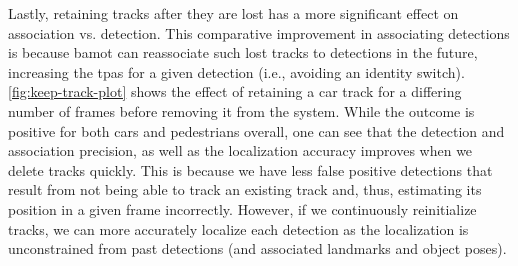 \documentclass[headsepline, hidelinks, footsepline, footinclude=false, oneside, fontsize=11pt, paper=a4, listof=totoc, bibliography=totoc]{scrbook}
\begin{document}
Lastly, retaining tracks after they are lost has a more significant effect on association vs. detection. 
This comparative improvement in associating detections is because \gls{bamot} can reassociate such lost tracks to detections in the future, 
increasing the \glspl{tpa} for a given detection (i.e., avoiding an identity switch).
\cref{fig:keep-track-plot} shows the effect of retaining a car track for a differing number of frames before removing it from the system.
While the outcome is positive for both cars and pedestrians overall, one can see that the detection and association precision, as well as the localization accuracy improves when we delete tracks quickly.
This is because we have less false positive detections that result from not being able to track an existing track and, thus, estimating its position in a given frame incorrectly.
However, if we continuously reinitialize tracks, we can more accurately localize each detection as the localization is unconstrained from past detections (and associated landmarks and object poses).
\end{document}
